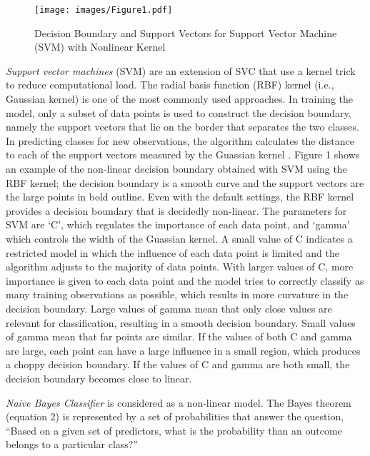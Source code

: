 \documentclass[sigconf]{acmart}
\begin{document}
\begin{figure}[!ht]
  \centering\texttt{[image: images/Figure1.pdf]}
  \caption{Decision Boundary and Support Vectors for Support Vector Machine 
  (SVM) with Nonlinear Kernel \cite{muller17}}
  \label{f:Figure1}
\end{figure}


\emph{Support vector machines} (SVM) are an extension of SVC that use a 
kernel trick to reduce computational load. The radial basis function (RBF) 
kernel (i.e., Gaussian kernel) is one of the most commonly used approaches. 
In training the model, only a subset of data points is used to construct the 
decision boundary, namely the support vectors that lie on the border that 
separates the two classes. In predicting classes for new observations, the 
algorithm calculates the distance to each of the support vectors measured 
by the Guassian kernel \cite{muller17}. Figure 1 shows an example of the 
non-linear decision boundary obtained with SVM using the RBF kernel; the 
decision boundary is a smooth curve and the support vectors are the large 
points in bold outline. Even with the default settings, the RBF kernel 
provides a decision boundary that is decidedly non-linear. The parameters 
for SVM are `C', which regulates the importance of each data point, and 
`gamma' which controls the width of the Guassian kernel. A small value of 
C indicates a restricted model in which the influence of each data point is 
limited and the algorithm adjusts to the majority of data points. With larger 
values of C, more importance is given to each data point and the model tries 
to correctly classify as many training observations as possible, which results 
in more curvature in the decision boundary. Large values of gamma mean that 
only close values are relevant for classification, resulting in a smooth 
decision boundary. Small values of gamma mean that far points are similar. 
If the values of both C and gamma are large, each point can have a large 
influence in a small region, which produces a choppy decision boundary. 
If the values of C and gamma are both small, the decision boundary becomes 
close to linear.


\emph{Naive Bayes Classifier} is considered as a non-linear model.
The Bayes theorem (equation 2) is represented by a set of probabilities 
that answer the question, ``Based on a given set of predictors, 
what is the probability than an outcome belongs to a particular class?''
\end{document}
